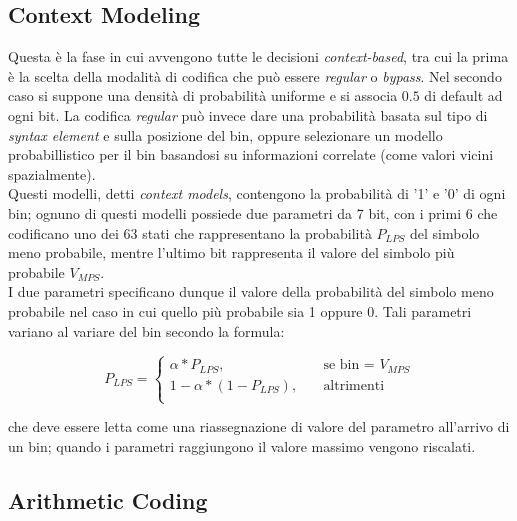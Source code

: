 \subsection{Context Modeling}
Questa è la fase in cui avvengono tutte le decisioni \emph{context-based}, tra
cui la prima è la scelta della modalità di codifica che può essere \emph{
regular} o \emph{bypass}. Nel secondo caso si suppone una densità di probabilità
uniforme e si associa $0.5$ di default ad ogni bit. La codifica \emph{regular}
può invece dare una probabilità basata sul tipo di \emph{syntax element} e sulla
posizione del bin, oppure selezionare un modello probabillistico per il bin 
basandosi su informazioni correlate (come valori vicini spazialmente). \\
Questi modelli, detti \emph{context models}, contengono la probabilità di '1' e
'0' di ogni bin; ognuno di questi modelli possiede due parametri  da 7 bit, con
i primi 6 che codificano uno dei 63 stati che rappresentano la probabilità 
$P_{LPS}$ del simbolo meno probabile, mentre l'ultimo bit rappresenta il valore 
del simbolo più probabile $V_{MPS}$. \\
I due parametri specificano dunque il valore della probabilità del simbolo meno
probabile nel caso in cui quello più probabile sia 1 oppure 0. Tali parametri 
variano al variare del bin secondo la formula:

\[ P_{LPS} = 
\begin{cases}
  \alpha * P_{LPS},         & \quad \text{se bin = } V_{MPS} \\
  1- \alpha *(1-P_{LPS}),   & \quad \text{altrimenti} \\
\end{cases}
\]

che deve essere letta come una riassegnazione di valore del parametro all'arrivo
di un bin; quando i parametri raggiungono il valore massimo vengono riscalati.

\subsection{Arithmetic Coding}
